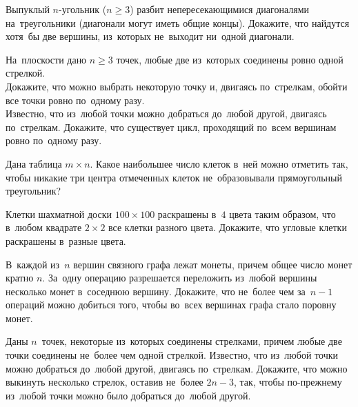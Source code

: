 


\begin{problems}

\item
Выпуклый $n$-угольник ($n \geq 3$) разбит непересекающимися диагоналями
на~треугольники (диагонали могут иметь общие концы).
Докажите, что найдутся хотя~бы две вершины, из~которых не~выходит ни~одной
диагонали.

\item
На~плоскости дано $n \geqslant 3$ точек, любые две из~которых соединены ровно
одной стрелкой.
\\
\subproblem
Докажите, что можно выбрать некоторую точку и, двигаясь по~стрелкам, обойти все
точки ровно по~одному разу.
\\
\subproblem
Известно, что из~любой точки можно добраться до~любой другой, двигаясь
по~стрелкам.
Докажите, что существует цикл, проходящий по~всем вершинам ровно по~одному
разу.

\item
Дана таблица $m \times n$.
Какое наибольшее число клеток в~ней можно отметить так, чтобы никакие три
центра отмеченных клеток не~образовывали прямоугольный треугольник?

\item
Клетки шахматной доски $100 \times 100$ раскрашены в~$4$ цвета таким образом,
что в~любом квадрате $2 \times 2$ все клетки разного цвета.
Докажите, что угловые клетки раскрашены в~разные цвета.

\item
В~каждой из~$n$ вершин связного графа лежат монеты, причем общее число монет
кратно $n$.
За~одну операцию разрешается переложить из~любой вершины несколько монет
в~соседнюю вершину.
Докажите, что не~более чем за~$n - 1$ операций можно добиться того, чтобы
во~всех вершинах графа стало поровну монет.

\item
Даны $n$~точек, некоторые из~которых соединены стрелками, причем любые две
точки соединены не~более чем одной стрелкой.
Известно, что из~любой точки можно добраться до~любой другой, двигаясь
по~стрелкам.
Докажите, что можно выкинуть несколько стрелок, оставив не~более $2n - 3$, так,
чтобы по-прежнему из~любой точки можно было добраться до~любой другой.


\end{problems}
